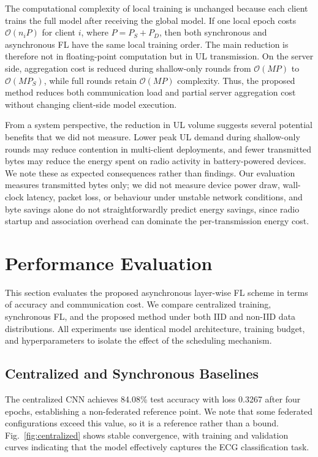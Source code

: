 \documentclass[10pt,conference]{IEEEtran}
\begin{document}
The computational complexity of local training is unchanged because each client trains the full model after receiving the global model. If one local epoch costs $\mathcal{O}(n_iP)$ for client $i$, where $P=P_S+P_D$, then both synchronous and asynchronous FL have the same local training order. The main reduction is therefore not in floating-point computation but in UL transmission. On the server side, aggregation cost is reduced during shallow-only rounds from $\mathcal{O}(MP)$ to $\mathcal{O}(MP_S)$, while full rounds retain $\mathcal{O}(MP)$ complexity. Thus, the proposed method reduces both communication load and partial server aggregation cost without changing client-side model execution.

From a system perspective, the reduction in UL volume suggests several potential benefits that we did not measure. Lower peak UL demand during shallow-only rounds may reduce contention in multi-client deployments, and fewer transmitted bytes may reduce the energy spent on radio activity in battery-powered devices. We note these as expected consequences rather than findings. Our evaluation measures transmitted bytes only; we did not measure device power draw, wall-clock latency, packet loss, or behaviour under unstable network conditions, and byte savings alone do not straightforwardly predict energy savings, since radio startup and association overhead can dominate the per-transmission energy cost.

\section{Performance Evaluation}

This section evaluates the proposed asynchronous layer-wise FL scheme in terms of accuracy and communication cost. We compare centralized training, synchronous FL, and the proposed method under both IID and non-IID data distributions. All experiments use identical model architecture, training budget, and hyperparameters to isolate the effect of the scheduling mechanism.

\subsection{Centralized and Synchronous Baselines}

The centralized CNN achieves 84.08\% test accuracy with loss 0.3267 after four epochs, establishing a non-federated reference point. We note that some federated configurations exceed this value, so it is a reference rather than a bound. Fig.~\ref{fig:centralized} shows stable convergence, with training and validation curves indicating that the model effectively captures the ECG classification task.
\end{document}
